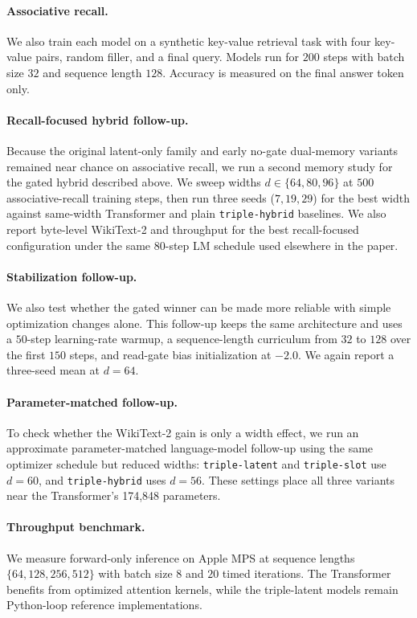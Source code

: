\documentclass[11pt]{article}
\begin{document}
\paragraph{Associative recall.}
We also train each model on a synthetic key-value retrieval task with four
key-value pairs, random filler, and a final query. Models run for $200$ steps
with batch size $32$ and sequence length $128$. Accuracy is measured on the
final answer token only.

\paragraph{Recall-focused hybrid follow-up.}
Because the original latent-only family and early no-gate dual-memory variants
remained near chance on associative recall, we run a second memory study for
the gated hybrid described above. We sweep widths $d \in \{64,80,96\}$ at
$500$ associative-recall training steps, then run three seeds
($7,19,29$) for the best width against same-width Transformer and plain
\texttt{triple-hybrid} baselines. We also report byte-level WikiText-2 and
throughput for the best recall-focused configuration under the same
$80$-step LM schedule used elsewhere in the paper.

\paragraph{Stabilization follow-up.}
We also test whether the gated winner can be made more reliable with simple
optimization changes alone. This follow-up keeps the same architecture and
uses a $50$-step learning-rate warmup, a sequence-length curriculum from $32$
to $128$ over the first $150$ steps, and read-gate bias initialization at
$-2.0$. We again report a three-seed mean at $d=64$.

\paragraph{Parameter-matched follow-up.}
To check whether the WikiText-2 gain is only a width effect, we run an
approximate parameter-matched language-model follow-up using the same optimizer
schedule but reduced widths: \texttt{triple-latent} and \texttt{triple-slot}
use $d=60$, and \texttt{triple-hybrid} uses $d=56$. These settings place all
three variants near the Transformer's 174{,}848 parameters.

\paragraph{Throughput benchmark.}
We measure forward-only inference on Apple MPS at sequence lengths
$\{64,128,256,512\}$ with batch size $8$ and $20$ timed iterations. The
Transformer benefits from optimized attention kernels, while the triple-latent
models remain Python-loop reference implementations.
\end{document}
